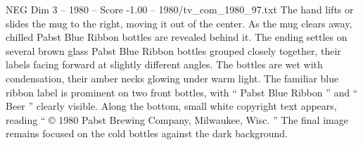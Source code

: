 \begin{textsample}{NEG Dim 3 – 1980 – Score -1.00 – 1980/tv\_com\_1980\_97.txt}
The hand lifts or slides the mug to the right, moving it out of the center.
As the mug clears away, chilled Pabst Blue Ribbon bottles are revealed behind it.
The ending settles on several brown glass Pabst Blue Ribbon bottles grouped closely together, their labels facing forward at slightly different angles.
The bottles are wet with condensation, their amber necks glowing under warm light.
The familiar blue ribbon label is prominent on two front bottles, with “ Pabst Blue Ribbon ” and “ Beer ” clearly visible.
Along the bottom, small white copyright text appears, reading “ {\EmojiFont ©} 1980 Pabst Brewing Company, Milwaukee, Wisc. ” The final image remains focused on the cold bottles against the dark background.

\end{textsample}
